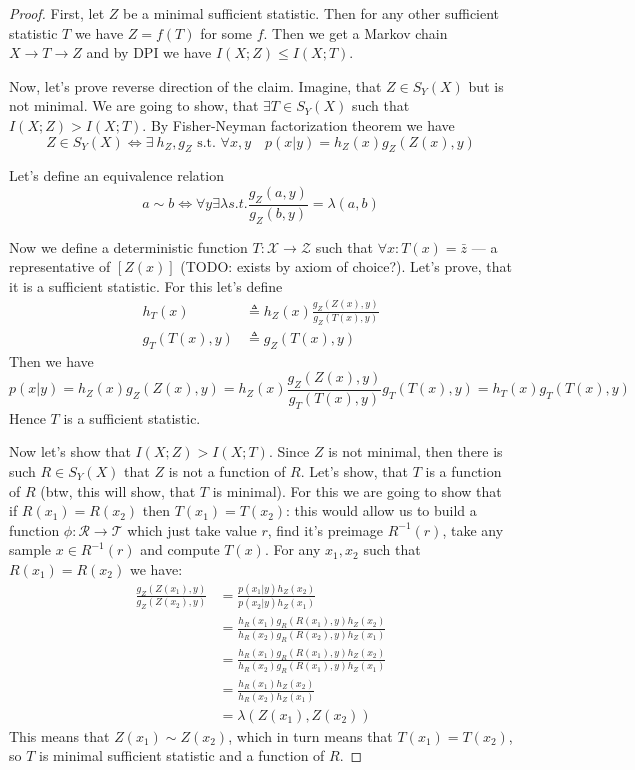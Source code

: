 \documentclass{article}
\begin{document}
\begin{proof}
First, let $Z$ be a minimal sufficient statistic.
Then for any other sufficient statistic $T$ we have $Z = f(T)$ for some $f$.
Then we get a Markov chain $X \to T \to Z$ and by DPI we have $I(X;Z) \leq I(X;T)$.

Now, let's prove reverse direction of the claim.
Imagine, that $Z \in S_Y(X)$ but is not minimal.
We are going to show, that $\exists T \in S_Y(X)$ such that $I(X;Z) > I(X;T)$.
By Fisher-Neyman factorization theorem we have
\[
Z \in S_Y(X) \Longleftrightarrow \exists\ h_Z, g_Z \text{ s.t. } \forall x,y \quad p(x|y) = h_Z(x) g_Z(Z(x), y)
\]

Let's define an equivalence relation
\[
a \sim b \Longleftrightarrow \forall y \exists \lambda s.t. \frac{g_Z(a, y)}{g_Z(b, y)} = \lambda(a, b)
\]

Now we define a deterministic function $T:\mathcal{X} \to \mathcal{Z}$ such that $\forall x: T(x) = \bar{z}$ --- a representative of $[Z(x)]$ (TODO: exists by axiom of choice?).
Let's prove, that it is a sufficient statistic.
For this let's define
\[
\begin{split}
h_T(x) &\triangleq h_Z(x) \frac{g_Z(Z(x), y)}{g_Z(T(x), y)} \\
g_T(T(x), y) &\triangleq g_Z(T(x), y)
\end{split}
\]
Then we have
\[
p(x|y) = h_Z(x) g_Z(Z(x), y) = h_Z(x) \frac{g_Z(Z(x), y)}{g_T(T(x), y)} g_T(T(x), y) = h_T(x) g_T(T(x), y)
\]
Hence $T$ is a sufficient statistic.

Now let's show that $I(X;Z) > I(X;T)$.
Since $Z$ is not minimal, then there is such $R \in S_Y(X)$ that $Z$ is not a function of $R$.
Let's show, that $T$ is a function of $R$ (btw, this will show, that $T$ is minimal).
For this we are going to show that if $R(x_1) = R(x_2)$ then $T(x_1) = T(x_2)$: this would allow us to build a function $\phi:\mathcal{R} \to \mathcal{T}$ which just take value $r$, find it's preimage $R^{-1}(r)$, take any sample $x \in R^{-1}(r)$ and compute $T(x)$.
For any $x_1, x_2$ such that $R(x_1) = R(x_2)$ we have:
\[
\begin{split}
\frac{g_Z(Z(x_1), y)}{g_Z(Z(x_2), y)}
&= \frac{p(x_1 | y) h_Z(x_2)}{p(x_2 | y) h_Z(x_1)} \\
&= \frac{h_R(x_1) g_R(R(x_1), y) h_Z(x_2)}{h_R(x_2) g_R(R(x_2), y) h_Z(x_1)} \\
&= \frac{h_R(x_1) g_R(R(x_1), y) h_Z(x_2)}{h_R(x_2) g_R(R(x_1), y) h_Z(x_1)} \\
&= \frac{h_R(x_1) h_Z(x_2)}{h_R(x_2) h_Z(x_1)} \\
&= \lambda(Z(x_1), Z(x_2))
\end{split}
\]
This means that $Z(x_1) \sim Z(x_2)$, which in turn means that $T(x_1) = T(x_2)$, so $T$ is minimal sufficient statistic and a function of $R$.
\end{proof}
\end{document}
